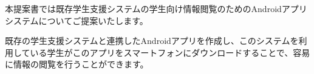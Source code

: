 本提案書では既存学生支援システムの学生向け情報閲覧のためのAndroidアプリシステムについてご提案いたします。


既存の学生支援システムと連携したAndroidアプリを作成し、このシステムを利用している学生がこのアプリをスマートフォンにダウンロードすることで、容易に情報の閲覧を行うことができます。
